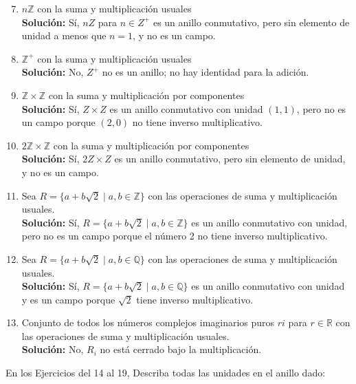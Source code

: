 \begin{enumerate}
	\setcounter{enumi}{6}
	\item $n\mathbb{Z}$ con la suma y multiplicación usuales \\
	\textbf{Solución:}
	Sí, $nZ$ para $n \in Z^+$ es un anillo conmutativo, pero sin elemento de unidad a menos que $n = 1$, y no es un campo.
	\item $\mathbb{Z}^+$ con la suma y multiplicación usuales \\
	\textbf{Solución:}
	No, $Z^+$ no es un anillo; no hay identidad para la adición.
	\item $\mathbb{Z} \times \mathbb{Z}$ con la suma y multiplicación por componentes \\
	\textbf{Solución:}
	Sí, $Z \times Z$ es un anillo conmutativo con unidad $(1, 1)$, pero no es un campo porque $(2, 0)$ no tiene inverso multiplicativo.
	\item $2\mathbb{Z} \times \mathbb{Z}$ con la suma y multiplicación por componentes \\
	\textbf{Solución:} Sí, $2Z \times Z$ es un anillo conmutativo, pero sin elemento de unidad, y no es un campo.
	\item Sea \(R = \{a + b\sqrt{2} \mid a, b \in \mathbb{Z}\}\) con las operaciones de suma y multiplicación usuales. \\
	\textbf{Solución:}
	Sí, \(R = \{a + b\sqrt{2} \mid a, b \in \mathbb{Z}\}\) es un anillo conmutativo con unidad, pero no es un campo porque el número 2 no tiene inverso multiplicativo.
	\item Sea \(R = \{a + b\sqrt{2} \mid a, b \in \mathbb{Q}\}\) con las operaciones de suma y multiplicación usuales. \\
	\textbf{Solución:}
	Sí, \(R = \{a + b\sqrt{2} \mid a, b \in \mathbb{Q}\}\) es un anillo conmutativo con unidad y es un campo porque \(\sqrt{2}\) tiene inverso multiplicativo.
	\item Conjunto de todos los números complejos imaginarios puros \(ri\) para \(r \in \mathbb{R}\) con las operaciones de suma y multiplicación usuales. \\
	\textbf{Solución:}
	No, \(R_i\) no está cerrado bajo la multiplicación.
\end{enumerate}
\noindent
En los Ejercicios del 14 al 19, Describa todas las unidades en el anillo dado:
